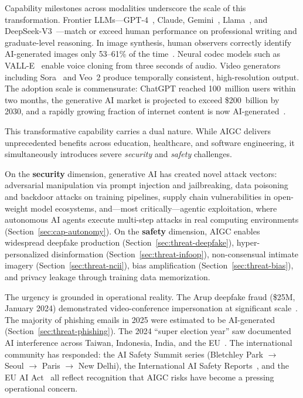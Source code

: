 Capability milestones across modalities underscore the scale of this transformation. Frontier LLMs---GPT-4~\cite{gpt4}, Claude, Gemini~\cite{gemini2024}, Llama~\cite{llama3}, and DeepSeek-V3~\cite{deepseekv3}---match or exceed human performance on professional writing and graduate-level reasoning. In image synthesis, human observers correctly identify AI-generated images only 53--61\% of the time~\cite{microsoft2025human}. Neural codec models such as VALL-E~\cite{wang2023valle} enable voice cloning from three seconds of audio. Video generators including Sora~\cite{brooks2024sora} and Veo~2 produce temporally consistent, high-resolution output. The adoption scale is commensurate: ChatGPT reached 100~million users within two months, the generative AI market is projected to exceed \$200~billion by 2030, and a rapidly growing fraction of internet content is now AI-generated~\cite{graphite2025aicontent}.


This transformative capability carries a dual nature. While AIGC delivers unprecedented benefits across education, healthcare, and software engineering, it simultaneously introduces severe \emph{security} and \emph{safety} challenges.

On the \textbf{security} dimension, generative AI has created novel attack vectors: adversarial manipulation via prompt injection and jailbreaking, data poisoning and backdoor attacks on training pipelines, supply chain vulnerabilities in open-weight model ecosystems, and---most critically---agentic exploitation, where autonomous AI agents execute multi-step attacks in real computing environments (Section~\ref{sec:cap-autonomy}). On the \textbf{safety} dimension, AIGC enables widespread deepfake production (Section~\ref{sec:threat-deepfake}), hyper-personalized disinformation (Section~\ref{sec:threat-infoop}), non-consensual intimate imagery (Section~\ref{sec:threat-ncii}), bias amplification (Section~\ref{sec:threat-bias}), and privacy leakage through training data memorization.

The urgency is grounded in operational reality. The Arup deepfake fraud (\$25M, January 2024) demonstrated video-conference impersonation at significant scale~\cite{brightside2025phishing}. The majority of phishing emails in 2025 were estimated to be AI-generated (Section~\ref{sec:threat-phishing}). The 2024 ``super election year'' saw documented AI interference across Taiwan, Indonesia, India, and the EU~\cite{restofworld2024tracker}. The international community has responded: the AI Safety Summit series (Bletchley Park $\to$ Seoul $\to$ Paris $\to$ New Delhi), the International AI Safety Reports~\cite{aisafetyreport2025,aisafetyreport2026}, and the EU AI Act~\cite{euaiact2024} all reflect recognition that AIGC risks have become a pressing operational concern.

